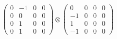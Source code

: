 \documentclass{article}
\begin{document}
{\begin{align}
            \begin{pmatrix} 0 & -1 & 0 & 0 \\ 0 & 0 & 0 & 0 \\ 0 & 1 & 0 & 0 \\ 0 & 1 & 0 & 0 \end{pmatrix} \otimes 
            \begin{pmatrix} 0 & 0 & 0 & 0 \\ -1 & 0 & 0 & 0 \\ 1 & 0 & 0 & 0 \\ -1 & 0 & 0 & 0 \end{pmatrix} 
        \end{align}
        }
        
        
        \begin{landscape}
        \resizebox{\columnwidth}{!}{
        \begin{tikzpicture}[node distance=3cm and 1cm, auto]
        

\end{tikzpicture}}
\end{landscape}
\end{document}
